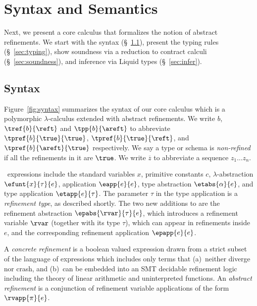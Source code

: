 \section{Syntax and Semantics}\label{sec:check}

Next, we present a core calculus \corelan that formalizes the notion
of abstract refinements. We start with the syntax (\S~\ref{sec:syntax}),
present the typing rules (\S~\ref{sec:typing}), show soundness 
via a reduction to contract calculi \cite{Knowles10,Greenberg11}
(\S~\ref{sec:soundness}), and inference via Liquid types (\S~\ref{sec:infer}).

\subsection{Syntax}\label{sec:syntax}

Figure~\ref{fig:syntax} summarizes the syntax of our core 
calculus \corelan which is a polymorphic $\lambda$-calculus 
extended with abstract refinements. 
%
We write 
$b$, 
$\tref{b}{\reft}$ and 
$\tpp{b}{\areft}$ 
to abbreviate 
$\tpref{b}{\true}{\true}$, 
$\tpref{b}{\true}{\reft}$, and
$\tpref{b}{\areft}{\true}$ respectively. 
We say a type or schema is \emph{non-refined} if all the 
refinements in it are $\true$. We write $\overline{z}$ 
to abbreviate a sequence $z_1 \ldots z_n$.


\corelan\ expressions include the standard variables $x$, 
primitive constants $c$, $\lambda$-abstraction $\efunt{x}{\tau}{e}$,
application $\eapp{e}{e}$, type abstraction $\etabs{\alpha}{e}$,
and type application $\etapp{e}{\tau}$. The parameter $\tau$ in 
the type application is a \emph{refinement type}, as described shortly.
The two new additions to \corelan are the refinement abstraction
$\epabs{\rvar}{\tau}{e}$, which introduces a refinement variable 
$\rvar$ (together with its type $\tau$), which can appear in refinements
inside $e$, and the corresponding refinement application $\epapp{e}{e}$.
%

A \emph{concrete refinement}  is a boolean valued expression  
drawn from a strict subset of the language of expressions which
includes only terms that 
(a)~neither diverge nor crash, and 
(b)~can be embedded into an SMT decidable refinement logic including 
the theory of linear arithmetic and uninterpreted functions.
%
An \emph{abstract refinement} \areft is a conjunction of refinement
variable applications of the form $\rvapp{\pi}{e}$.

